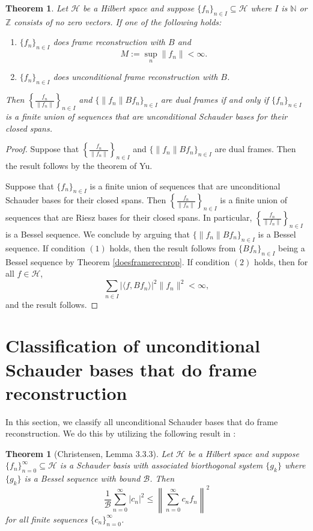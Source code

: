 \documentclass[11pt]{amsart}
\newtheorem{thm}{Theorem}[section]
\newtheorem*{thm*}{Theorem}
\theoremstyle{definition}
\numberwithin{equation}{section}
\newcommand{\Hcal}{\mathcal{H}} %
\begin{document}
\begin{thm}
Let $\Hcal$ be a Hilbert space and suppose  $\{f_{n}\}_{n\in I}\subseteq \Hcal$ where $I$ is $\mathbb{N}$ or $\mathbb{Z}$ consists of no zero vectors. If one of the following holds:
\begin{enumerate}
    \item $\{f_{n}\}_{n\in I}$ does frame reconstruction with $B$ and \[
M := \sup_n \|f_n\| < \infty.
\]
\item $\{f_{n}\}_{n\in I}$ does unconditional frame reconstruction with $B$.
\end{enumerate}
 Then $\left\{\frac{f_n}{\|f_n\|} \right\}_{n\in I}$ and $\{\|f_n\|Bf_n\}_{n\in I}$ are dual frames if and only if $\{f_{n}\}_{n\in I}$ is a finite union of sequences that are unconditional Schauder bases for their closed spans.
\end{thm}
\begin{proof}
Suppose that $\left\{\frac{f_n}{\|f_n\|} \right\}_{n\in I}$ and $\{\|f_n\|Bf_n\}_{n\in I}$ are dual frames. Then the result follows by the theorem of Yu.

Suppose that $\{f_{n}\}_{n\in I}$ is a finite union of sequences that are unconditional Schauder bases for their closed spans. Then $\left\{\frac{f_n}{\|f_n\|} \right\}_{n\in I}$ is a finite union of sequences that are Riesz bases for their closed spans. In particular, $\left\{\frac{f_n}{\|f_n\|} \right\}_{n\in I}$ is a Bessel sequence. We conclude by arguing that $\{\|f_n\|Bf_n\}_{n\in I}$ is a Bessel sequence. If condition $(1)$ holds, then the result follows from $\{Bf_n\}_{n\in I}$ being a Bessel sequence by Theorem \ref{doesframerecprop}. If condition $(2)$ holds, then for all $f\in \Hcal$,
$$\sum_{n\in I}|\langle f, Bf_n\rangle |^{2}\|f_n\|^{2}<\infty,$$ and the result follows.
\end{proof}

\section{Classification of unconditional Schauder bases that do frame reconstruction}\label{s7}

In this section, we classify all unconditional Schauder bases that do frame reconstruction. We do this by utilizing the following result in \cite{Christensen2016Frames}:

\begin{thm*}[Christensen, Lemma 3.3.3]
Let $\Hcal$ be a Hilbert space and suppose  $\{f_{n}\}_{n=0}^{\infty}\subseteq \Hcal$ is a Schauder basis with associated biorthogonal system $\{g_{k}\}$ where $\{g_{k}\}$ is a Bessel sequence with bound $\mathcal{B}$. Then
$$\frac{1}{\mathcal{B}}\sum_{n=0}^{\infty} |c_{n}|^{2}\leq \left \|\sum_{n=0}^{\infty} c_n f_n \right \|^{2}$$
for all finite sequences $\{c_n\}_{n=0}^{\infty}$.
\end{thm*}
\end{document}
